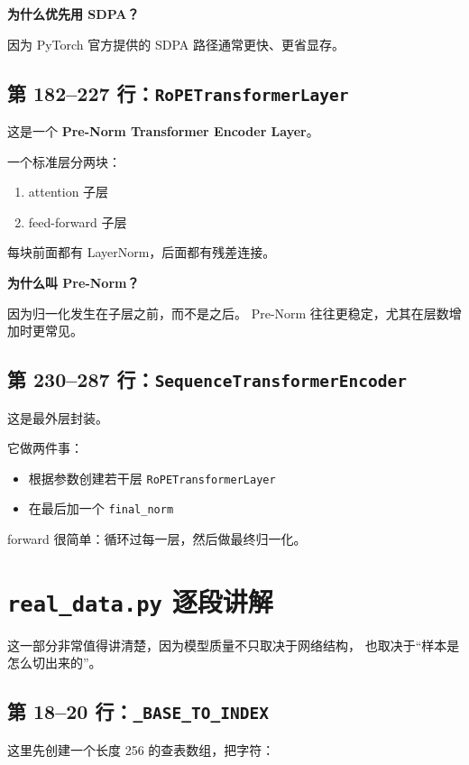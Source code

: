\documentclass[11pt,a4paper]{ctexart}
\begin{document}
\textbf{为什么优先用 SDPA？}

因为 PyTorch 官方提供的 SDPA 路径通常更快、更省显存。

\subsection{第 182--227 行：\texttt{RoPETransformerLayer}}

这是一个 \textbf{Pre-Norm Transformer Encoder Layer}。

一个标准层分两块：

\begin{enumerate}[leftmargin=2em]
\item attention 子层
\item feed-forward 子层
\end{enumerate}

每块前面都有 LayerNorm，后面都有残差连接。

\textbf{为什么叫 Pre-Norm？}

因为归一化发生在子层之前，而不是之后。
Pre-Norm 往往更稳定，尤其在层数增加时更常见。

\subsection{第 230--287 行：\texttt{SequenceTransformerEncoder}}

这是最外层封装。

它做两件事：

\begin{itemize}[leftmargin=2em]
\item 根据参数创建若干层 \texttt{RoPETransformerLayer}
\item 在最后加一个 \texttt{final\_norm}
\end{itemize}

forward 很简单：循环过每一层，然后做最终归一化。

\section{\texttt{real\_data.py} 逐段讲解}

这一部分非常值得讲清楚，因为模型质量不只取决于网络结构，
也取决于“样本是怎么切出来的”。

\subsection{第 18--20 行：\texttt{\_BASE\_TO\_INDEX}}

这里先创建一个长度 256 的查表数组，把字符：
\end{document}
